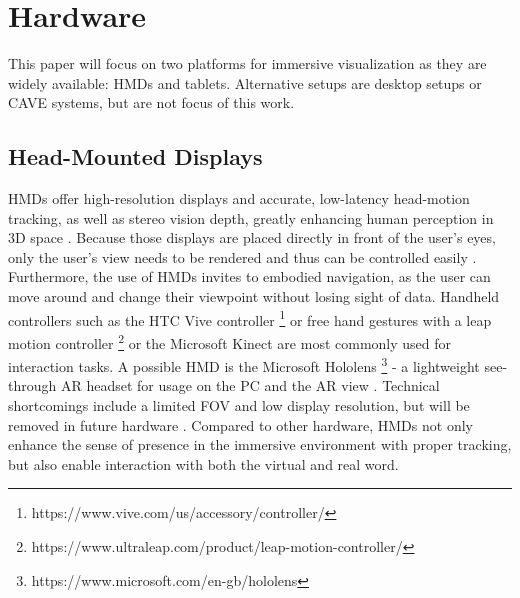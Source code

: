 \section{Hardware}
\label{section:hardware}
This paper will focus on two platforms for immersive visualization as they are widely available: \ac{HMD}s and tablets. Alternative setups are desktop setups or CAVE systems, but are not focus of this work.

\subsection{Head-Mounted Displays}
\label{subsection:hmd}
\ac{HMD}s offer high-resolution displays and accurate, low-latency head-motion tracking, as well as stereo vision depth, greatly enhancing human perception in 3D space \autocite[46]{Cordeil2017}. 
Because those displays are placed directly in front of the user's eyes, only the user's view needs to be rendered and thus can be controlled easily \autocite[1802]{Kwon2016}.
Furthermore, the use of \ac{HMD}s invites to embodied navigation, as the user can move around and change their viewpoint without losing sight of data. Handheld controllers such as the HTC Vive controller \footnote{https://www.vive.com/us/accessory/controller/} or free hand gestures with a leap motion controller \footnote{https://www.ultraleap.com/product/leap-motion-controller/} or the Microsoft Kinect are most commonly used for interaction tasks.\newline
A possible \ac{HMD} is the Microsoft Hololens \footnote{https://www.microsoft.com/en-gb/hololens} - a lightweight see-through AR headset for usage on the PC and the AR view \autocite[]{Wang2020}.
Technical shortcomings include a limited \ac{FOV} and low display resolution, but will be removed in future hardware \autocite[]{Wang2020}. Compared to other hardware, \ac{HMD}s not only enhance the sense of presence in the immersive environment with proper tracking, but also enable interaction with both the virtual and real word.\newline

